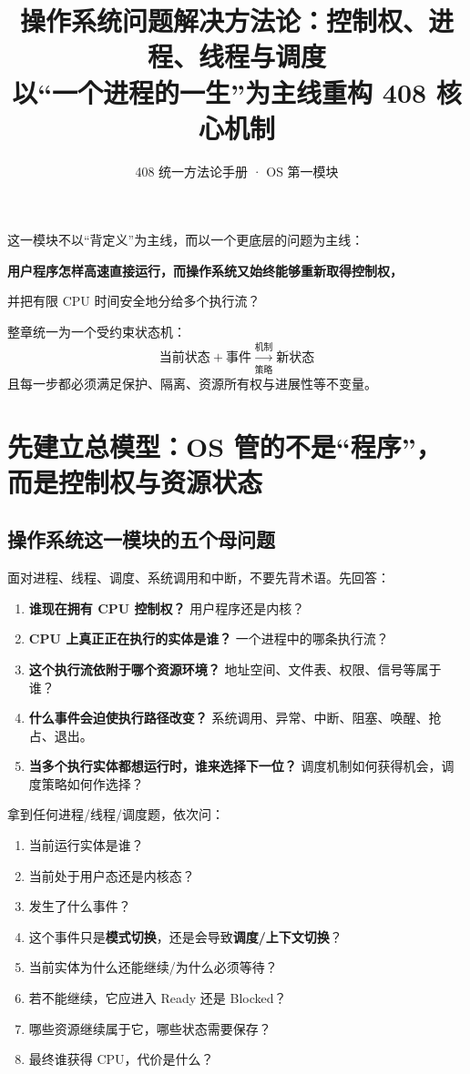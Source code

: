 \documentclass[11pt,a4paper]{ctexart}
\title{\vspace{-1.2cm}\textbf{操作系统问题解决方法论：控制权、进程、线程与调度}\\[0.4em]
\large 以“一个进程的一生”为主线重构 408 核心机制}
\author{408 统一方法论手册 · OS 第一模块}
\date{}
\newcommand{\kw}[1]{\textbf{#1}}
\begin{document}
\maketitle
\begin{corebox}[本章总纲]
这一模块不以“背定义”为主线，而以一个更底层的问题为主线：

\begin{center}
\Large\bfseries 用户程序怎样高速直接运行，而操作系统又始终能够重新取得控制权，\par
并把有限 CPU 时间安全地分给多个执行流？
\end{center}

整章统一为一个受约束状态机：
\[
\boxed{\text{当前状态}+\text{事件}\xrightarrow[\text{策略}]{\text{机制}}\text{新状态}}
\]
且每一步都必须满足保护、隔离、资源所有权与进展性等不变量。
\end{corebox}

\tableofcontents
\newpage

\section{先建立总模型：OS 管的不是“程序”，而是控制权与资源状态}

\subsection{操作系统这一模块的五个母问题}

面对进程、线程、调度、系统调用和中断，不要先背术语。先回答：

\begin{enumerate}
  \item \kw{谁现在拥有 CPU 控制权？} 用户程序还是内核？
  \item \kw{CPU 上真正正在执行的实体是谁？} 一个进程中的哪条执行流？
  \item \kw{这个执行流依附于哪个资源环境？} 地址空间、文件表、权限、信号等属于谁？
  \item \kw{什么事件会迫使执行路径改变？} 系统调用、异常、中断、阻塞、唤醒、抢占、退出。
  \item \kw{当多个执行实体都想运行时，谁来选择下一位？} 调度机制如何获得机会，调度策略如何作选择？
\end{enumerate}

\begin{method}[OS 第一模块统一解题八问]
拿到任何进程/线程/调度题，依次问：
\begin{enumerate}
\item 当前运行实体是谁？
\item 当前处于用户态还是内核态？
\item 发生了什么事件？
\item 这个事件只是\kw{模式切换}，还是会导致\kw{调度/上下文切换}？
\item 当前实体为什么还能继续/为什么必须等待？
\item 若不能继续，它应进入 Ready 还是 Blocked？
\item 哪些资源继续属于它，哪些状态需要保存？
\item 最终谁获得 CPU，代价是什么？
\end{enumerate}
\end{method}
\end{document}
